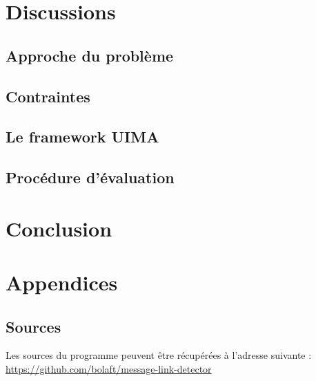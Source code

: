 \documentclass[a4paper]{article}
\begin{document}
\FloatBarrier

\section{Discussions}

\subsection{Approche du problème}

\subsection{Contraintes}

\subsection{Le framework UIMA}

\subsection{Procédure d'évaluation}

\section{Conclusion}

\section{Appendices}

\subsection{Sources}

Les sources du programme peuvent être récupérées à l'adresse suivante : \url{https://github.com/bolaft/message-link-detector}
\end{document}
